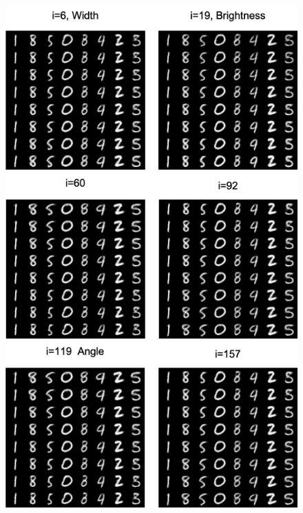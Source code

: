 \documentclass[sigconf, anonymous, review]{acmart}
\theoremstyle{plain}
\theoremstyle{definition}
\theoremstyle{remark}
\begin{document}
\begin{figure}[h!]
\begin{center}
 \includegraphics[width=0.75\linewidth]{fig/6_19.png}
  \includegraphics[width=0.75\linewidth]{fig/60_92.png} 
    \includegraphics[width=0.75\linewidth]{fig/119_157.png} 
\end{center}
\vspace{-0.1in}
\label{fig:mnist_dis}\vspace{-0.1in}
\end{figure}
\end{document}
